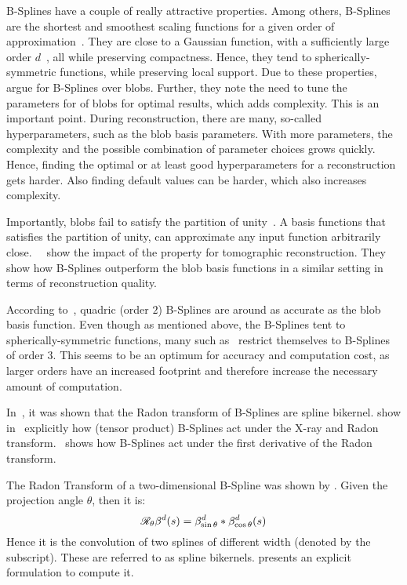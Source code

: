 B-Splines have a couple of really attractive properties. Among others, B-Splines are the shortest
and smoothest scaling functions for a given order of approximation~\cite{momey_b-spline_2012}. They
are close to a Gaussian function, with a sufficiently large order \(d\)~\cite{momey_b-spline_2012},
all while preserving compactness. Hence, they tend to spherically-symmetric functions, while
preserving local support. Due to these properties, \citeauthor*{momey_new_2011}\cite{momey_new_2011}
argue for B-Splines over blobs. Further, they note the need to tune the parameters for of blobs for
optimal results, which adds complexity. This is an important point. During reconstruction, there are
many, so-called hyperparameters, such as the blob basis parameters. With more parameters, the
complexity and the possible combination of parameter choices grows quickly. Hence, finding the
optimal or at least good hyperparameters for a reconstruction gets harder. Also finding default
values can be harder, which also increases complexity.

Importantly, blobs fail to satisfy the partition of unity~\cite{nilchian_fast_2013}. A basis
functions that satisfies the partition of unity, can approximate any input function arbitrarily
close.~\citeauthor*{nilchian_fast_2013}~\cite{nilchian_fast_2013} show the impact of the property
for tomographic reconstruction. They show how B-Splines outperform the blob basis functions in a
similar setting in terms of reconstruction quality.

According to~\cite{momey_spline_2015}, quadric (order \(2\)) B-Splines are around as accurate as the
blob basis function. Even though as mentioned above, the B-Splines tent to spherically-symmetric
functions, many such
as~\cite{momey_new_2011,momey_b-spline_2012,momey_spline_2015,nilchian_fast_2013} restrict
themselves to B-Splines of order \(3\). This seems to be an optimum for accuracy and computation
cost, as larger orders have an increased footprint and therefore increase the necessary amount of
computation.

In~\cite{horbelt_discretization_2002}, it was shown that the Radon transform of B-Splines are spline
bikernel. \citeauthor*{entezari_box_2012} show in~\cite{entezari_box_2012} explicitly how (tensor
product) B-Splines act under the X-ray and Radon transform.~\cite{nilchian_differential_2012} shows
how B-Splines act under the first derivative of the Radon transform.

The Radon Transform of a two-dimensional B-Spline was shown by
\citeauthor*{horbelt_discretization_2002}\cite{horbelt_discretization_2002}. Given the projection
angle \(\theta\), then it is:
\begin{equation}
	\mathscr{R}_\theta\beta^d(s) = \beta^d_{\sin\theta} * \beta^d_{\cos\theta}(s)
\end{equation}
Hence it is the convolution of two splines of different width (denoted by the subscript). These are
referred to as spline bikernels. \citeauthor*{horbelt_discretization_2002} presents an explicit
formulation to compute it.

